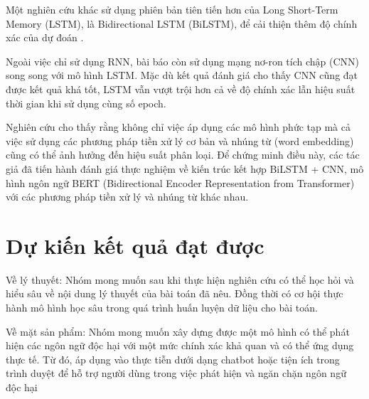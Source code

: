 Một nghiên cứu khác sử dụng phiên bản tiên tiến hơn của Long Short-Term Memory (LSTM), là Bidirectional LSTM (BiLSTM), để cải thiện thêm độ chính xác của dự đoán \cite{webpage25}.

Ngoài việc chỉ sử dụng RNN, bài báo \cite{Sharma2018} còn sử dụng mạng nơ-ron tích chập (CNN) song song với mô hình LSTM. Mặc dù kết quả đánh giá cho thấy CNN cũng đạt được kết quả khá tốt, LSTM vẫn vượt trội hơn cả về độ chính xác lẫn hiệu suất thời gian khi sử dụng cùng số epoch.

Nghiên cứu \cite{app10238631} cho thấy rằng không chỉ việc áp dụng các mô hình phức tạp mà cả việc sử dụng các phương pháp tiền xử lý cơ bản và nhúng từ (word embedding) cũng có thể ảnh hưởng đến hiệu suất phân loại. Để chứng minh điều này, các tác giả đã tiến hành đánh giá thực nghiệm về kiến trúc kết hợp BiLSTM + CNN, mô hình ngôn ngữ BERT (Bidirectional Encoder Representation from Transformer) với các phương pháp tiền xử lý và nhúng từ khác nhau.

\section{Dự kiến kết quả đạt được}
Về lý thuyết: Nhóm mong muốn sau khi thực hiện nghiên cứu có thể học hỏi và hiểu sâu về nội dung lý thuyết của bài toán đã nêu. Đồng thời có cơ hội thực hành mô hình học sâu trong quá trình huấn luyện dữ liệu cho bài toán.

Về mặt sản phẩm: Nhóm mong muốn xây dựng được một mô hình có thể phát hiện các ngôn ngữ độc hại với một mức chính xác khả quan và có thể ứng dụng thực tế. Từ đó, áp dụng vào thực tiễn dưới dạng chatbot hoặc tiện ích trong trình duyệt để hỗ trợ người dùng trong việc phát hiện và ngăn chặn ngôn ngữ độc hại
